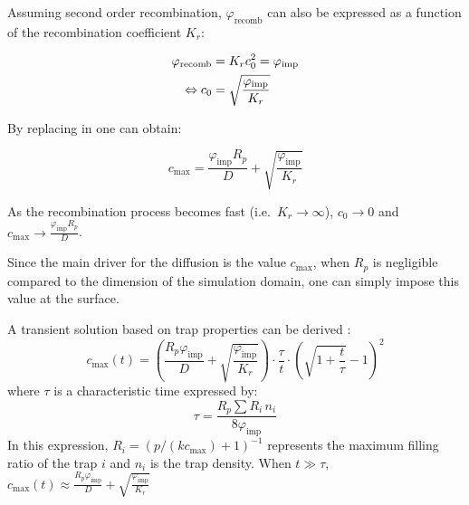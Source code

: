 Assuming second order recombination, $\varphi_\mathrm{recomb}$ can also be expressed as a function of the recombination coefficient $K_r$:

\begin{align}
    \varphi_\mathrm{recomb} &= K_r c_{0}^{2} = \varphi_\mathrm{imp}\\
    \Leftrightarrow c_{0} &= \sqrt{\frac{\varphi_\mathrm{imp}}{K_r}}
    \labeq{c_0}
\end{align}

By replacing  in  one can obtain:

\begin{equation}
    c_\mathrm{max} = \frac{\varphi_\mathrm{imp} R_{p}}{D}+\sqrt{\frac{\varphi_\mathrm{imp}}{K_r}}
\end{equation}

As the recombination process becomes fast (i.e.\ $K_r \rightarrow \infty$), $c_0 \rightarrow 0$ and $c_\mathrm{max} \rightarrow \frac{\varphi_\mathrm{imp} R_{p}}{D}$.

Since the main driver for the diffusion is the value $c_\mathrm{max}$, when $R_p$ is negligible compared to the dimension of the simulation domain, one can simply impose this value at the surface.

A transient solution based on trap properties can be derived :
\begin{equation}
    c_\mathrm{max}(t)=\left( \frac{R_p \varphi_\mathrm{imp}}{D} + \sqrt{\frac{\varphi_\mathrm{imp}}{K_r}} \right) \cdot \frac{\tau}{t} \cdot\left(\sqrt{1+\frac{t}{\tau}}-1\right)^2
\end{equation}
where $\tau$ is a characteristic time expressed by:
\begin{equation}
    \tau = \frac{R_p \sum R_i \, n_i}{8 \varphi_\mathrm{imp}}
\end{equation}
In this expression, $R_i = (p / (k c_\mathrm{max}) + 1)^{-1}$ represents the maximum filling ratio of the trap $i$ and $n_i$ is the trap density.
When $t \gg \tau$, $c_\mathrm{max}(t) \approx \frac{R_p \varphi_\mathrm{imp}}{D} + \sqrt{\frac{\varphi_\mathrm{imp}}{K_r}}$

